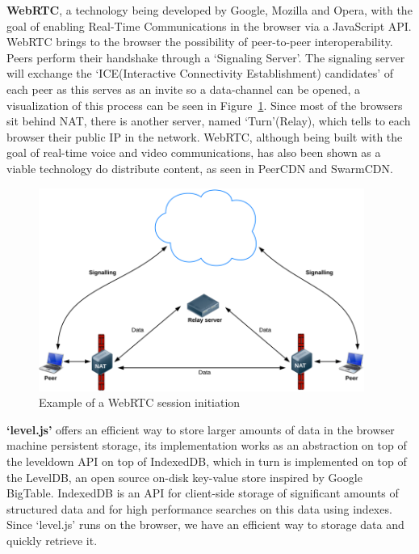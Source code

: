 \textbf{WebRTC}\cite{IanHickson2013}, a technology being developed by Google, Mozilla and Opera, with the goal of enabling Real-Time Communications in the browser via a JavaScript API. WebRTC brings to the browser the possibility of peer-to-peer interoperability. Peers perform their handshake through a `Signaling Server'. The signaling server will exchange the `ICE(Interactive Connectivity Establishment) candidates' of each peer as this serves as an invite so a data-channel can be opened, a visualization of this process can be seen in Figure~\ref{fig:webrtc}. Since most of the browsers sit behind NAT, there is another server, named `Turn'(Relay), which tells to each browser their public IP in the network. WebRTC, although being built with the goal of real-time voice and video communications, has also been shown as a viable technology do distribute content, as seen in PeerCDN and SwarmCDN\cite{Vogt}.

\begin{figure}[h!]
  \centering
  \includegraphics[width=0.95\textwidth]{img/webrtc.png}
  \caption{Example of a WebRTC session initiation}
  \label{fig:webrtc}
\end{figure}

% 
% 


\textbf{`level.js'} offers an efficient way to store larger amounts of data in the browser machine persistent storage, its implementation works as an abstraction on top of the leveldown API on top of IndexedDB\cite{Recommendation2013}, which in turn is implemented on top of the LevelDB\cite{JeffreyDean;SanjayGhemawat}, an open source on-disk key-value store inspired by Google BigTable. IndexedDB is an API for client-side storage of significant amounts of structured data and for high performance searches on this data using indexes. Since `level.js' runs on the browser, we have an efficient way to storage data and quickly retrieve it.


